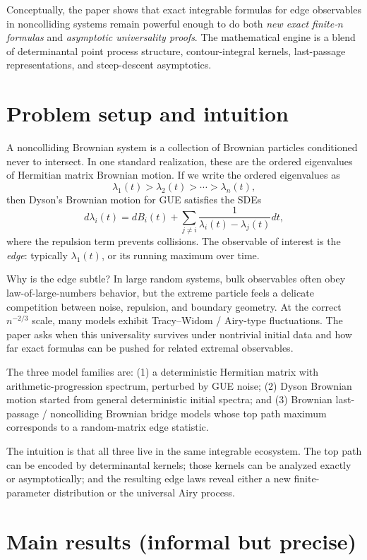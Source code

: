 \documentclass[11pt]{article}
\begin{document}
Conceptually, the paper shows that exact integrable formulas for edge observables in noncolliding systems remain powerful enough to do both \emph{new exact finite-$n$ formulas} and \emph{asymptotic universality proofs}. The mathematical engine is a blend of determinantal point process structure, contour-integral kernels, last-passage representations, and steep-descent asymptotics.

\section*{Problem setup and intuition}
A noncolliding Brownian system is a collection of Brownian particles conditioned never to intersect. In one standard realization, these are the ordered eigenvalues of Hermitian matrix Brownian motion. If we write the ordered eigenvalues as
\[
\lambda_1(t) > \lambda_2(t) > \cdots > \lambda_n(t),
\]
then Dyson's Brownian motion for GUE satisfies the SDEs
\[
d\lambda_i(t)=dB_i(t)+\sum_{j\neq i}\frac{1}{\lambda_i(t)-\lambda_j(t)}dt,
\]
where the repulsion term prevents collisions. The observable of interest is the \emph{edge}: typically $\lambda_1(t)$, or its running maximum over time.

Why is the edge subtle? In large random systems, bulk observables often obey law-of-large-numbers behavior, but the extreme particle feels a delicate competition between noise, repulsion, and boundary geometry. At the correct $n^{-2/3}$ scale, many models exhibit Tracy--Widom / Airy-type fluctuations. The paper asks when this universality survives under nontrivial initial data and how far exact formulas can be pushed for related extremal observables.

The three model families are: (1) a deterministic Hermitian matrix with arithmetic-progression spectrum, perturbed by GUE noise; (2) Dyson Brownian motion started from general deterministic initial spectra; and (3) Brownian last-passage / noncolliding Brownian bridge models whose top path maximum corresponds to a random-matrix edge statistic.

The intuition is that all three live in the same integrable ecosystem. The top path can be encoded by determinantal kernels; those kernels can be analyzed exactly or asymptotically; and the resulting edge laws reveal either a new finite-parameter distribution or the universal Airy process.

\section*{Main results (informal but precise)}
\end{document}

